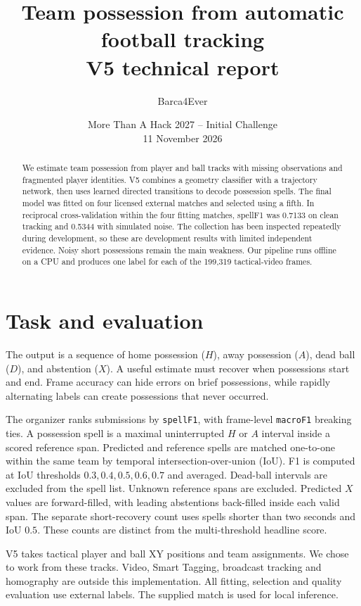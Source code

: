 \documentclass[11pt,a4paper]{article}
\title{\vspace{-1.2cm}Team possession from automatic football tracking\\
  \large V5 technical report}
\author{Barca4Ever}
\date{More Than A Hack 2027 -- Initial Challenge\\11 November 2026}
\begin{document}
\maketitle
\vspace{-0.7cm}
\begin{abstract}
We estimate team possession from player and ball tracks with missing observations
and fragmented player identities. V5 combines a geometry classifier with a
trajectory network, then uses learned directed transitions to decode possession
spells. The final model was fitted on four licensed external matches and selected
using a fifth. In reciprocal cross-validation within the four fitting matches,
spellF1 was 0.7133 on clean tracking and 0.5344 with simulated noise. The collection
has been inspected repeatedly during development, so these are development
results with limited independent evidence. Noisy short possessions remain the
main weakness. Our pipeline runs offline on a CPU and produces one
label for each of the 199,319 tactical-video frames.
\end{abstract}

\section{Task and evaluation}
The output is a sequence of home possession ($H$), away possession ($A$), dead ball
($D$), and abstention ($X$). A useful estimate must recover when possessions start
and end. Frame accuracy can hide errors on brief possessions, while rapidly
alternating labels can create possessions that never occurred.

The organizer ranks submissions by \texttt{spellF1}, with frame-level
\texttt{macroF1} breaking ties. A possession spell is a
maximal uninterrupted $H$ or $A$ interval inside a scored reference span. Predicted
and reference spells are matched one-to-one within the same team by temporal
intersection-over-union (IoU). F1 is computed at IoU thresholds
$0.3,0.4,0.5,0.6,0.7$ and averaged. Dead-ball intervals are excluded from the spell
list. Unknown reference spans are excluded. Predicted $X$ values are forward-filled,
with leading abstentions back-filled inside each valid span. The separate short-recovery count
uses spells shorter than two seconds and IoU $0.5$. These counts are distinct from
the multi-threshold headline score.

V5 takes tactical player and ball XY positions and team assignments. We chose to
work from these tracks. Video, Smart Tagging, broadcast tracking and homography
are outside this implementation. All fitting, selection and quality evaluation
use external labels. The supplied match is used for local inference.
\end{document}

